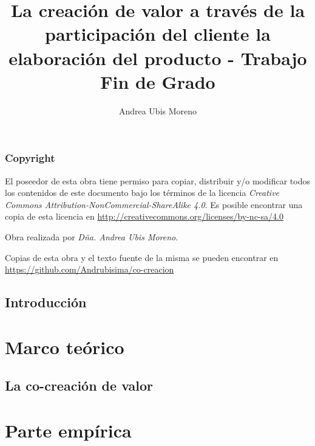 \documentclass[a4paper,11pt]{scrbook} %
\title{La creación de valor a través de la participación del cliente la elaboración del producto - Trabajo Fin de Grado}
\author{Andrea Ubis Moreno}
\begin{document}



\section*{Copyright}
El poseedor de esta obra tiene permiso para copiar, distribuir y/o modificar todos los contenidos de este documento bajo los términos de la licencia \emph{Creative Commons Attribution-NonCommercial-ShareAlike 4.0}. Es posible encontrar una copia de esta licencia en \url{http://creativecommons.org/licenses/by-nc-sa/4.0}

Obra realizada por \emph{Dña. Andrea Ubis Moreno}.

Copias de esta obra y el texto fuente de la misma se pueden encontrar en \url{https://github.com/Andrubisima/co-creacion}


\frontmatter                                              %





\tableofcontents

\listoffigures
\listoftables

\chapter{Introducción}




\mainmatter                                               %

\part{Marco teórico}

\chapter{La co-creación de valor}
\label{section:cocreacion}


\part{Parte empírica}
\end{document}
